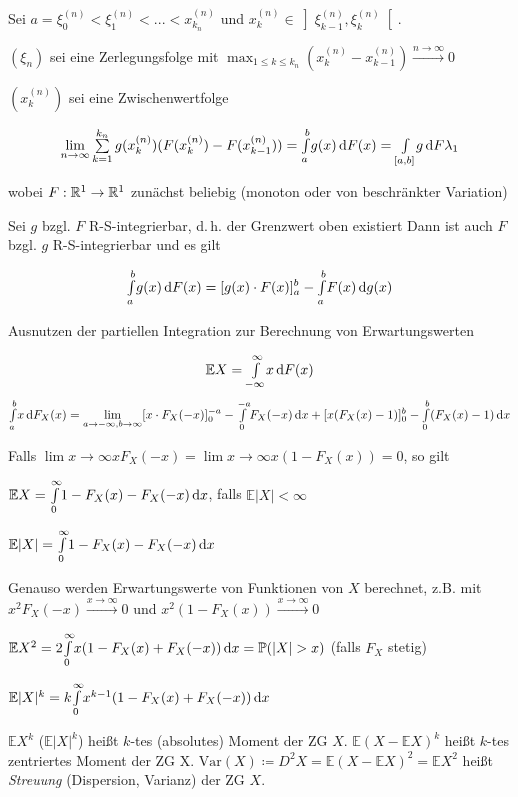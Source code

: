 \documentclass{cheat-sheet}
\renewcommand{\P}{\mathbb{P}} %
\newcommand{\E}{\mathbb{E}} %
\begin{document}
Sei $a = \xi_0^{(n)} < \xi_1^{(n)} < ... < x_{k_n}^{(n)}$ und $x_k^{(n)} \in \left] \xi_{k-1}^{(n)}, \xi_{k}^{(n)} \right[$.

\begin{defn}
  $(\xi_n)$ sei eine Zerlegungsfolge mit $\max_{1 \leq k \leq k_n} (x_k^{(n)} - x_{k-1}^{(n)}) \xrightarrow{n \to \infty} 0$

  $(x_k^{(n)})$ sei eine Zwischenwertfolge

  \[ \lim_{n \to \infty} \sum_{k=1}^{k_n} g(x_k^{(n)}) (F(x_k^{(n)}) - F(x_{k-1}^{(n)})) = \Int{a}{b}{g(x)}{F(x)} = \Int{[a, b]}{}{g}{F\lambda_1} \]

  wobei $F : \mathbb{R}^1 \to \mathbb{R}^1$ zunächst beliebig (monoton oder von beschränkter Variation)
\end{defn}


Sei $g$ bzgl. $F$ R-S-integrierbar, d.\,h. der Grenzwert oben existiert
Dann ist auch $F$ bzgl. $g$ R-S-integrierbar und es gilt

\[ {\textstyle \int\limits_{a}^{b}} g(x) \,\mathrm{d} F(x) = [g(x) \cdot F(x)]_a^b - {\textstyle \int\limits_{a}^{b}} F(x) \,\mathrm{d} g(x) \]

Ausnutzen der partiellen Integration zur Berechnung von Erwartungswerten

\[ \E X = \Int{- \infty}{\infty}{x}{F(x)} \]
\[ {\textstyle \int\limits_{a}^{b}} x \,\mathrm{d} F_X(x) = \lim_{a \to -\infty, b \to \infty} [x \cdot F_X(-x)]_0^{-a} - {\textstyle \int\limits_{0}^{-a}} F_X(-x) \,\mathrm{d} x + [x (F_X(x) - 1)]_0^b - {\textstyle \int\limits_{0}^{b}} (F_X(x) - 1) \,\mathrm{d} x \]

Falls $\lim{x \to \infty} x F_X(-x) = \lim{x \to \infty} x (1 - F_X(x)) = 0$, so gilt

$\E X = \Int{0}{\infty}{1 - F_X(x) - F_X(-x)}{x}$, falls $\E |X| < \infty$

$\E |X| = \Int{0}{\infty}{1 - F_X(x) - F_X(-x)}{x}$

Genauso werden Erwartungswerte von Funktionen von $X$ berechnet, z.B. mit $x^2 F_X(-x) \xrightarrow{x \to \infty} 0$ und $x^2 (1 - F_X(x)) \xrightarrow{x \to \infty} 0$

$\E X^2 = 2 \Int{0}{\infty}{x (1 - F_X(x) + F_X(-x))}{x} = \P(|X| > x)$ (falls $F_X$ stetig)

$\E |X|^k = k \Int{0}{\infty}{x^{k-1} (1 - F_X(x) + F_X(-x))}{x}$

\begin{defn}
  $\E X^k$ ($\E |X|^k$) heißt $k$-tes (absolutes) Moment der ZG $X$. $\E (X - \E X)^k$ heißt $k$-tes zentriertes Moment der ZG X. $\mathrm{Var}(X) \coloneqq D^2 X = \E (X - \E X)^2 = \E X^2$ heißt \emph{Streuung} (Dispersion, Varianz) der ZG $X$.
\end{defn}
\end{document}
